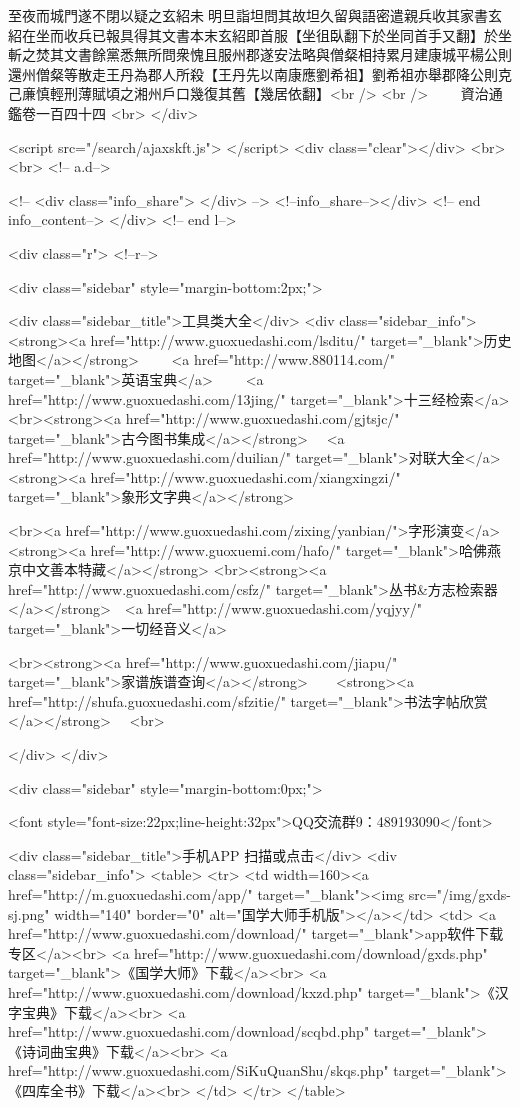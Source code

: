 至夜而城門遂不閉以疑之玄紹未明旦詣坦問其故坦久留與語密遣親兵收其家書玄紹在坐而收兵已報具得其文書本末玄紹即首服【坐徂臥翻下於坐同首手又翻】於坐斬之焚其文書餘黨悉無所問衆愧且服州郡遂安法略與僧粲相持累月建康城平楊公則還州僧粲等散走王丹為郡人所殺【王丹先以南康應劉希祖】劉希祖亦舉郡降公則克己亷慎輕刑薄賦頃之湘州戶口幾復其舊【幾居依翻】<br />
<br />
　　資治通鑑卷一百四十四  <br>
   </div> 

<script src="/search/ajaxskft.js"> </script>
 <div class="clear"></div>
<br>
<br>
 <!-- a.d-->

 <!--
<div class="info_share">
</div> 
-->
 <!--info_share--></div>   <!-- end info_content-->
  </div> <!-- end l-->

<div class="r">   <!--r-->



<div class="sidebar"  style="margin-bottom:2px;">

 
<div class="sidebar_title">工具类大全</div>
<div class="sidebar_info">
<strong><a href="http://www.guoxuedashi.com/lsditu/" target="_blank">历史地图</a></strong>　　
<a href="http://www.880114.com/" target="_blank">英语宝典</a>　　
<a href="http://www.guoxuedashi.com/13jing/" target="_blank">十三经检索</a>　
<br><strong><a href="http://www.guoxuedashi.com/gjtsjc/" target="_blank">古今图书集成</a></strong>　
<a href="http://www.guoxuedashi.com/duilian/" target="_blank">对联大全</a>　<strong><a href="http://www.guoxuedashi.com/xiangxingzi/" target="_blank">象形文字典</a></strong>　

<br><a href="http://www.guoxuedashi.com/zixing/yanbian/">字形演变</a>　　<strong><a href="http://www.guoxuemi.com/hafo/" target="_blank">哈佛燕京中文善本特藏</a></strong>
<br><strong><a href="http://www.guoxuedashi.com/csfz/" target="_blank">丛书&方志检索器</a></strong>　<a href="http://www.guoxuedashi.com/yqjyy/" target="_blank">一切经音义</a>　　

<br><strong><a href="http://www.guoxuedashi.com/jiapu/" target="_blank">家谱族谱查询</a></strong>　　<strong><a href="http://shufa.guoxuedashi.com/sfzitie/" target="_blank">书法字帖欣赏</a></strong>　
<br>

</div>
</div>


<div class="sidebar" style="margin-bottom:0px;">

<font style="font-size:22px;line-height:32px">QQ交流群9：489193090</font>


<div class="sidebar_title">手机APP 扫描或点击</div>
<div class="sidebar_info">
<table>
<tr>
	<td width=160><a href="http://m.guoxuedashi.com/app/" target="_blank"><img src="/img/gxds-sj.png" width="140"  border="0" alt="国学大师手机版"></a></td>
	<td>
<a href="http://www.guoxuedashi.com/download/" target="_blank">app软件下载专区</a><br>
<a href="http://www.guoxuedashi.com/download/gxds.php" target="_blank">《国学大师》下载</a><br>
<a href="http://www.guoxuedashi.com/download/kxzd.php" target="_blank">《汉字宝典》下载</a><br>
<a href="http://www.guoxuedashi.com/download/scqbd.php" target="_blank">《诗词曲宝典》下载</a><br>
<a href="http://www.guoxuedashi.com/SiKuQuanShu/skqs.php" target="_blank">《四库全书》下载</a><br>
</td>
</tr>
</table>

